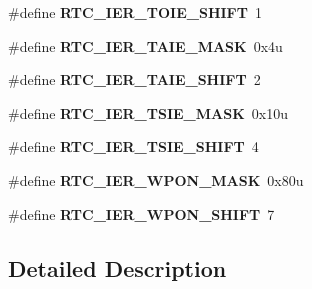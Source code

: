 \begin{DoxyCompactItemize}
\item 
\hypertarget{group___r_t_c___register___masks_gaf9355764ec83dde6e2890f391a469856}{}\#define {\bfseries R\+T\+C\+\_\+\+I\+E\+R\+\_\+\+T\+O\+I\+E\+\_\+\+S\+H\+I\+F\+T}~1\label{group___r_t_c___register___masks_gaf9355764ec83dde6e2890f391a469856}

\item 
\hypertarget{group___r_t_c___register___masks_gad1bcc4df9a637ec5ab4b611391986c06}{}\#define {\bfseries R\+T\+C\+\_\+\+I\+E\+R\+\_\+\+T\+A\+I\+E\+\_\+\+M\+A\+S\+K}~0x4u\label{group___r_t_c___register___masks_gad1bcc4df9a637ec5ab4b611391986c06}

\item 
\hypertarget{group___r_t_c___register___masks_gae15cd7098592da4c3a2c2563879ae5d8}{}\#define {\bfseries R\+T\+C\+\_\+\+I\+E\+R\+\_\+\+T\+A\+I\+E\+\_\+\+S\+H\+I\+F\+T}~2\label{group___r_t_c___register___masks_gae15cd7098592da4c3a2c2563879ae5d8}

\item 
\hypertarget{group___r_t_c___register___masks_ga63c8ae5db82845d5bb13907cd0e70cd7}{}\#define {\bfseries R\+T\+C\+\_\+\+I\+E\+R\+\_\+\+T\+S\+I\+E\+\_\+\+M\+A\+S\+K}~0x10u\label{group___r_t_c___register___masks_ga63c8ae5db82845d5bb13907cd0e70cd7}

\item 
\hypertarget{group___r_t_c___register___masks_ga456ec6fb31112c122b38dcc586d9e75d}{}\#define {\bfseries R\+T\+C\+\_\+\+I\+E\+R\+\_\+\+T\+S\+I\+E\+\_\+\+S\+H\+I\+F\+T}~4\label{group___r_t_c___register___masks_ga456ec6fb31112c122b38dcc586d9e75d}

\item 
\hypertarget{group___r_t_c___register___masks_gae08d5bcb3d71bb932a7c1d41086b3545}{}\#define {\bfseries R\+T\+C\+\_\+\+I\+E\+R\+\_\+\+W\+P\+O\+N\+\_\+\+M\+A\+S\+K}~0x80u\label{group___r_t_c___register___masks_gae08d5bcb3d71bb932a7c1d41086b3545}

\item 
\hypertarget{group___r_t_c___register___masks_gaa18422218526a3bb50a3158c3aee2100}{}\#define {\bfseries R\+T\+C\+\_\+\+I\+E\+R\+\_\+\+W\+P\+O\+N\+\_\+\+S\+H\+I\+F\+T}~7\label{group___r_t_c___register___masks_gaa18422218526a3bb50a3158c3aee2100}

\end{DoxyCompactItemize}


\subsection{Detailed Description}
